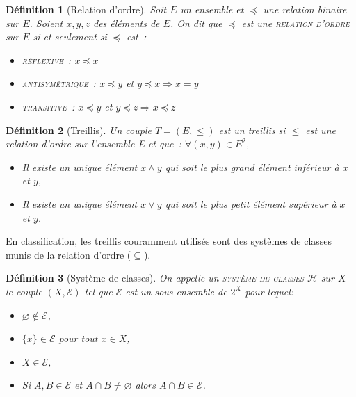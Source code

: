 \documentclass[a4paper]{report}
\newcommand{\meet}{\wedge}
\newcommand{\join}{\vee}
\newtheorem{definition}{Définition}[chapter]
\begin{document}
\begin{definition}[Relation d'ordre]

Soit $E$ un ensemble et $\preccurlyeq$ une relation binaire sur $E$.
Soient $x, y, z$ des éléments de $E$.
On dit que $\preccurlyeq$ est une \textsc{relation d'ordre} sur $E$ si et seulement si $\preccurlyeq$ est~:
\begin{itemize}
 \item \textsc{réflexive}~: $x \preccurlyeq x$ 
 \item \textsc{antisymétrique}~: $x \preccurlyeq y$ et $y \preccurlyeq x \Rightarrow x = y$
 \item \textsc{transitive}~: $x \preccurlyeq y$ et $y \preccurlyeq z \Rightarrow x \preccurlyeq z$ 
\end{itemize}

\end{definition}

\begin{definition}[Treillis] 

Un couple $T = (E, \leq)$ est un treillis si $\leq$ est une relation d'ordre sur l'ensemble E et que~:
$\forall (x, y) \in E^2$,

\begin{itemize}
\item Il existe un unique élément $x \meet y$ qui soit le plus grand élément inférieur à $x$ et $y$,
\item Il existe un unique élément $x \join y$ qui soit le plus petit élément supérieur à $x$ et $y$.
\end{itemize}

\end{definition}

En classification, les treillis couramment utilisés sont des systèmes de classes munis de la relation d'ordre ($\subseteq$).

\begin{definition}[Système de classes]

\label{sysclass}
On appelle un \textsc{système de classes}  $\mathcal{H}$ sur $X$ le couple $(X, \mathcal{E})$ tel que $\mathcal{E}$ est un sous ensemble de $2^X$
pour lequel:

\begin{itemize}
 \item $\varnothing \notin \mathcal{E}$,
 \item $\{x\} \in \mathcal{E}$ pour tout $x \in X$,
 \item $X \in \mathcal{E}$,
 \item Si $A, B \in \mathcal{E}$ et $A \cap B \neq \varnothing $ alors $A \cap B \in \mathcal{E}$.
\end{itemize}

\end{definition}
\end{document}
